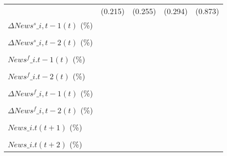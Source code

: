 {\begin{tabular}{l*{4}{c}}
                    &     (0.215)         &     (0.255)         &     (0.294)         &     (0.873)         \\
\addlinespace
$ \Delta News^s\_{i,t-1}(t)$ (\%)&                     &                     &                     &                     \\
                    &                     &                     &                     &                     \\
\addlinespace
$ \Delta News^s\_{i,t-2}(t)$ (\%)&                     &                     &                     &                     \\
                    &                     &                     &                     &                     \\
\addlinespace
$ News^f\_{i.t-1}(t)$ (\%)&                     &                     &                     &                     \\
                    &                     &                     &                     &                     \\
\addlinespace
$ News^f\_{i.t-2}(t)$ (\%)&                     &                     &                     &                     \\
                    &                     &                     &                     &                     \\
\addlinespace
$ \Delta News^f\_{i,t-1}(t)$ (\%)&                     &                     &                     &                     \\
                    &                     &                     &                     &                     \\
\addlinespace
$ \Delta News^f\_{i,t-2}(t)$ (\%)&                     &                     &                     &                     \\
                    &                     &                     &                     &                     \\
\addlinespace
$ News\_{i.t}(t+1)$ (\%)&                     &                     &                     &                     \\
                    &                     &                     &                     &                     \\
\addlinespace
$ News\_{i.t}(t+2)$ (\%)&                     &                     &                     &                     \\

\end{tabular}}
